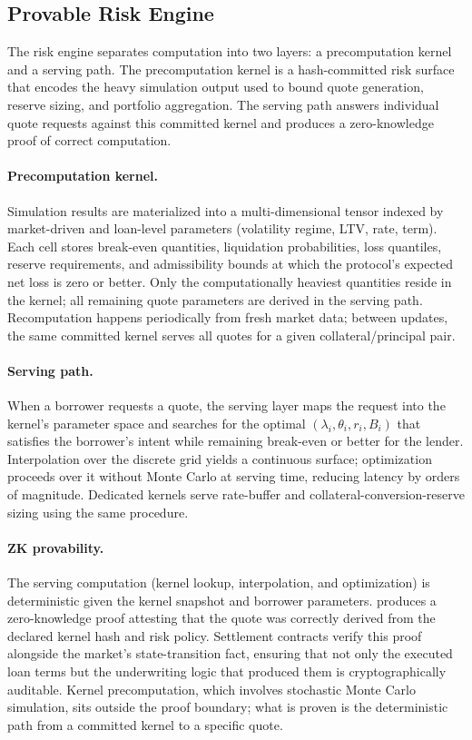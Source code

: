 \subsection{Provable Risk Engine}
\label{subsec:provable-risk-engine}

The risk engine separates computation into two layers: a precomputation kernel
and a serving path. The precomputation kernel is a hash-committed risk surface
that encodes the heavy simulation output used to
bound quote generation, reserve sizing, and portfolio aggregation. The serving
path answers individual quote requests against this committed kernel and
produces a zero-knowledge proof of correct computation.

\paragraph{Precomputation kernel.}
Simulation results are materialized into a multi-dimensional tensor indexed by
market-driven and loan-level parameters (volatility regime, LTV, rate, term).
Each cell stores break-even quantities, liquidation probabilities, loss quantiles,
reserve requirements, and admissibility bounds at which the protocol's expected
net loss is zero or better. Only the computationally heaviest quantities reside
in the kernel; all remaining quote parameters are derived in the serving
path. Recomputation happens periodically from fresh market data; between
updates, the same committed kernel serves all quotes for a given
collateral/principal pair.

\paragraph{Serving path.} When a borrower requests a quote, the serving layer maps the request into the kernel's parameter space and searches for the optimal $(\lambda_i,\theta_i,r_i,B_i)$ that satisfies the borrower's intent while remaining break-even or better for the lender. Interpolation over the discrete grid yields a continuous surface; optimization proceeds over it without Monte Carlo at serving time, reducing latency by orders of magnitude. Dedicated kernels serve rate-buffer and collateral-conversion-reserve sizing using the same procedure.

\paragraph{ZK provability.} The serving computation (kernel lookup, interpolation, and optimization) is deterministic given the kernel snapshot and borrower parameters. \daloc{} produces a zero-knowledge proof attesting that the quote was correctly derived from the declared kernel hash and risk policy. Settlement contracts verify this proof alongside the market's state-transition fact, ensuring that not only the executed loan terms but the underwriting logic that produced them is cryptographically auditable. Kernel precomputation, which involves stochastic Monte Carlo simulation, sits outside the proof boundary; what is proven is the deterministic path from a committed kernel to a specific quote.

